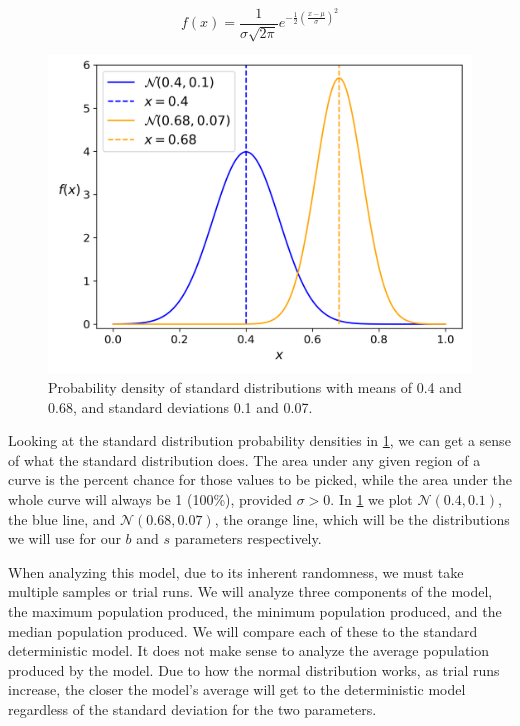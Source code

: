 \documentclass{article}
\begin{document}
\begin{equation} \label{eq:standard-distribution}
    f(x) = \frac{1}{\sigma\sqrt{2\pi}}e^{-\frac{1}{2}\left(\frac{x-\mu}{\sigma}\right)^2}
\end{equation}

\begin{figure}[h!]
    \centering
    \includegraphics[width=.5\linewidth]{plots/standard-distribution.png}
    \caption{Probability density of standard distributions with means of 0.4 and 0.68, and standard deviations 0.1 and 0.07.}
    \label{fig:standard-distribution}
\end{figure}

Looking at the standard distribution probability densities in \cref{fig:standard-distribution}, we can get a sense of what the standard distribution does. The area under any given region of a curve is the percent chance for those values to be picked, while the area under the whole curve will always be 1 (100\%), provided $\sigma > 0$. In \cref{fig:standard-distribution} we plot $\mathcal{N}(0.4, 0.1)$, the blue line, and $\mathcal{N}(0.68, 0.07)$, the orange line, which will be the distributions we will use for our $b$ and $s$ parameters respectively.

When analyzing this model, due to its inherent randomness, we must take multiple samples or trial runs. We will analyze three components of the model, the maximum population produced, the minimum population produced, and the median population produced. We will compare each of these to the standard deterministic model. It does not make sense to analyze the average population produced by the model. Due to how the normal distribution works, as trial runs increase, the closer the model's average will get to the deterministic model regardless of the standard deviation for the two parameters.
\end{document}
